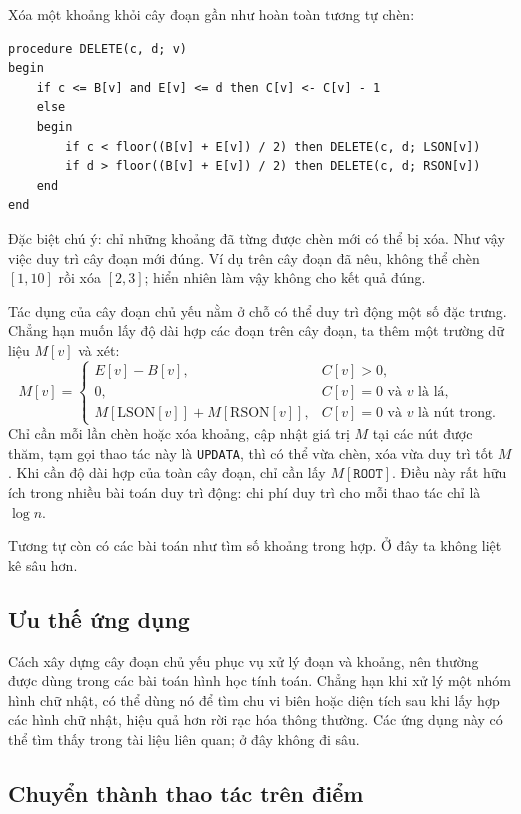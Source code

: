 \documentclass[11pt]{article}
\begin{document}
Xóa một khoảng khỏi cây đoạn gần như hoàn toàn tương tự chèn:

\begin{verbatim}
procedure DELETE(c, d; v)
begin
    if c <= B[v] and E[v] <= d then C[v] <- C[v] - 1
    else
    begin
        if c < floor((B[v] + E[v]) / 2) then DELETE(c, d; LSON[v])
        if d > floor((B[v] + E[v]) / 2) then DELETE(c, d; RSON[v])
    end
end
\end{verbatim}

Đặc biệt chú ý: chỉ những khoảng đã từng được chèn mới có thể bị xóa. Như vậy
việc duy trì cây đoạn mới đúng. Ví dụ trên cây đoạn đã nêu, không thể chèn
\([1,10]\) rồi xóa \([2,3]\); hiển nhiên làm vậy không cho kết quả đúng.

Tác dụng của cây đoạn chủ yếu nằm ở chỗ có thể duy trì động một số đặc trưng.
Chẳng hạn muốn lấy độ dài hợp các đoạn trên cây đoạn, ta thêm một trường dữ
liệu \(M[v]\) và xét:
\[
M[v]=
\begin{cases}
E[v]-B[v], & C[v]>0,\\
0, & C[v]=0\text{ và }v\text{ là lá},\\
M[\mathrm{LSON}[v]]+M[\mathrm{RSON}[v]], &
  C[v]=0\text{ và }v\text{ là nút trong}.
\end{cases}
\]
Chỉ cần mỗi lần chèn hoặc xóa khoảng, cập nhật giá trị \(M\) tại các nút được
thăm, tạm gọi thao tác này là \texttt{UPDATA}, thì có thể vừa chèn, xóa vừa
duy trì tốt \(M\). Khi cần độ dài hợp của toàn cây đoạn, chỉ cần lấy
\(M[\texttt{ROOT}]\). Điều này rất hữu ích trong nhiều bài toán duy trì động:
chi phí duy trì cho mỗi thao tác chỉ là \(\log n\).

Tương tự còn có các bài toán như tìm số khoảng trong hợp. Ở đây ta không liệt
kê sâu hơn.

\subsection{Ưu thế ứng dụng}

Cách xây dựng cây đoạn chủ yếu phục vụ xử lý đoạn và khoảng, nên thường được
dùng trong các bài toán hình học tính toán. Chẳng hạn khi xử lý một nhóm hình
chữ nhật, có thể dùng nó để tìm chu vi biên hoặc diện tích sau khi lấy hợp các
hình chữ nhật, hiệu quả hơn rời rạc hóa thông thường. Các ứng dụng này có thể
tìm thấy trong tài liệu liên quan; ở đây không đi sâu.

\subsection{Chuyển thành thao tác trên điểm}
\end{document}
